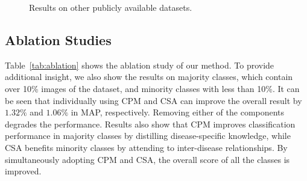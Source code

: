 \documentclass[runningheads]{llncs}
\begin{document}
\begin{figure}[t]
{    }
	\caption{Results on other publicly available datasets.}
 \label{fig:other-dataset}
\end{figure}

\subsection{Ablation Studies}

Table~\ref{tab:ablation} shows the ablation study of our method. 
To provide additional insight, we also show the results on majority classes, which contain over 10\% images of the dataset, and minority classes with less than 10\%. 
It can be seen that individually using CPM and CSA can improve the overall result by $1.32\%$ and $1.06\%$ in MAP, respectively. Removing either of the components degrades the performance. 
Results also show that CPM improves classification performance in majority classes by distilling disease-specific knowledge, while CSA benefits minority classes by attending to inter-disease relationships. By simultaneously adopting CPM and CSA, the overall score of all the classes is improved. 
\end{document}
